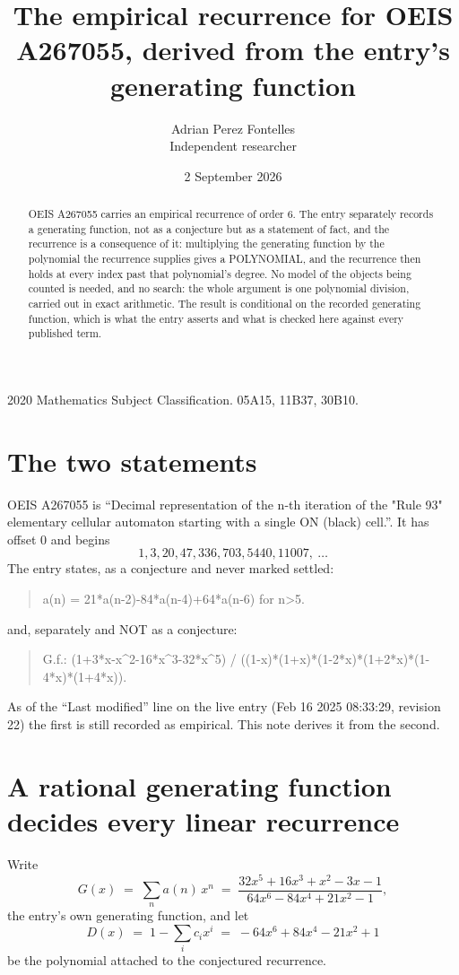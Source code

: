 \documentclass[11pt,a4paper]{article}
\title{The empirical recurrence for OEIS A267055, derived from the entry's generating function}
\author{Adrian Perez Fontelles\\ \small Independent researcher}
\date{2 September 2026}
\theoremstyle{plain}
\theoremstyle{definition}
\begin{document}
\maketitle

\begin{abstract}
OEIS A267055 carries an empirical recurrence of order $6$. The entry separately records a
generating function, not as a conjecture but as a statement of fact, and the recurrence is a
consequence of it: multiplying the generating function by the polynomial the recurrence
supplies gives a POLYNOMIAL, and the recurrence then holds at every index past that
polynomial's degree. No model of the objects being counted is needed, and no search: the
whole argument is one polynomial division, carried out in exact arithmetic. The result is
conditional on the recorded generating function, which is what the entry asserts and what is
checked here against every published term.
\end{abstract}

\noindent\small 2020 Mathematics Subject Classification. 05A15, 11B37, 30B10.\normalsize

\section{The two statements}

OEIS A267055 is ``Decimal representation of the n-th iteration of the "Rule 93" elementary cellular automaton starting with a single ON (black) cell.''. It has offset $0$ and begins
\[
1, 3, 20, 47, 336, 703, 5440, 11007,\ \dots
\]
The entry states, as a conjecture and never marked settled:
\begin{quote}
a(n) = 21*a(n-2)-84*a(n-4)+64*a(n-6) for n>5.
\end{quote}
and, separately and NOT as a conjecture:
\begin{quote}
G.f.: (1+3*x-x\^{}2-16*x\^{}3-32*x\^{}5) / ((1-x)*(1+x)*(1-2*x)*(1+2*x)*(1-4*x)*(1+4*x)).
\end{quote}
As of the ``Last modified'' line on the live entry (Feb 16 2025 08:33:29, revision 22) the first is still
recorded as empirical. This note derives it from the second.

\section{A rational generating function decides every linear recurrence}

Write
\[
G(x)\;=\;\sum_{n}a(n)\,x^{n}\;=\;\frac{32 x^{5} + 16 x^{3} + x^{2} - 3 x - 1}{64 x^{6} - 84 x^{4} + 21 x^{2} - 1},
\]
the entry's own generating function, and let
\[
D(x)\;=\;1-\sum_i c_i x^{i}\;=\;- 64 x^{6} + 84 x^{4} - 21 x^{2} + 1
\]
be the polynomial attached to the conjectured recurrence.
\end{document}
